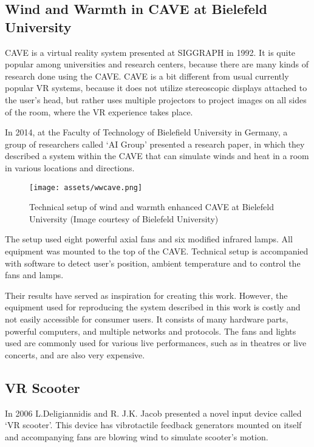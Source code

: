 \hypertarget{x-wind-and-warmth-in-cave-at-bielefeld-university}{\subsection{Wind and Warmth in CAVE at Bielefeld University}}
CAVE is a virtual reality system presented at SIGGRAPH in 1992.
It is quite popular among universities and research centers, because there are
many kinds of research done using the CAVE. CAVE is a bit different from
usual currently popular VR systems, because it does not utilize
stereoscopic displays attached to the user’s head, but rather uses multiple
projectors to project images on all sides of the room, where the
VR experience takes place.


In 2014, at the Faculty of Technology of Bielefield University in Germany,
a group of researchers called `AI Group' presented a research paper, in which
they described a system within the CAVE that can simulate winds
and heat in a room in various locations and directions.\,\cite{wwcave}

\begin{figure}[h]{}
    \centering\texttt{[image: assets/wwcave.png]}
    \caption{Technical setup of wind and warmth enhanced CAVE at 
    Bielefeld University (Image courtesy of Bielefeld University)}
\end{figure}

The setup used eight powerful axial fans and six modified
infrared lamps. All equipment was mounted to the top of the CAVE. Technical
setup is accompanied with software to detect user's position, ambient
temperature and to control the fans and lamps.

Their results have served as inspiration for creating this work.
However, the equipment used for reproducing the system described in this work
is costly and not easily accessible for consumer users.
It consists of many hardware parts, powerful computers, and multiple
networks and protocols. The fans and lights used are commonly used
for various live performances, such as in theatres or live concerts, and are
also very expensive.


\hypertarget{x-vr-scooter}{\subsection{VR Scooter}}
In 2006 L.Deligiannidis and R. J.K. Jacob presented a novel input device called
`VR scooter'. This device has vibrotactile feedback generators mounted on itself
and accompanying fans are blowing wind to simulate scooter’s motion.\,\cite{vrscooter}

